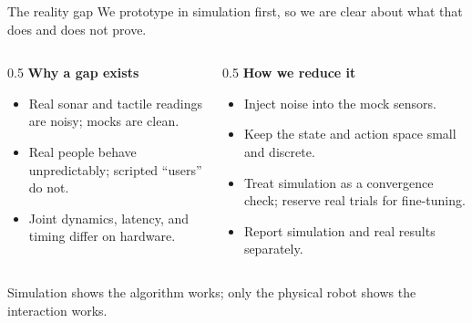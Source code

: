 \documentclass[aspectratio=169,10pt]{beamer}
\begin{document}
\begin{frame}{The reality gap}
  \footnotesize
  We prototype in simulation first, so we are clear about what that does and does not prove.
  \begin{columns}[T]
    \begin{column}{0.5\textwidth}
      \textbf{Why a gap exists}
      \begin{itemize}
        \item Real sonar and tactile readings are noisy; mocks are clean.
        \item Real people behave unpredictably; scripted ``users'' do not.
        \item Joint dynamics, latency, and timing differ on hardware.
      \end{itemize}
    \end{column}
    \begin{column}{0.5\textwidth}
      \textbf{How we reduce it}
      \begin{itemize}
        \item Inject noise into the mock sensors.
        \item Keep the state and action space small and discrete.
        \item Treat simulation as a convergence check; reserve real trials for fine-tuning.
        \item Report simulation and real results separately.
      \end{itemize}
    \end{column}
  \end{columns}
  \vspace{0.3em}
  \begin{block}{}
    \footnotesize Simulation shows the algorithm works; only the physical robot shows the interaction works.
  \end{block}
\end{frame}
\end{document}
